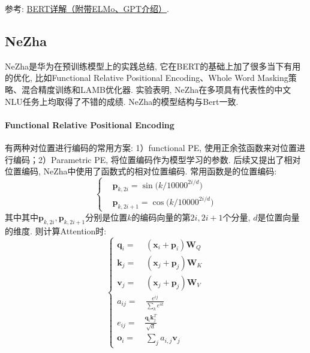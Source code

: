 参考: \href{https://cloud.tencent.com/developer/article/1666168}{BERT详解（附带ELMo、GPT介绍）}.

\subsection{NeZha}
NeZha\cite{junqiu2019nezha}是华为在预训练模型上的实践总结, 它在BERT的基础上加了很多当下有用的优化, 比如Functional Relative Positional Encoding、Whole Word Masking策略、混合精度训练和LAMB优化器. 实验表明, NeZha在多项具有代表性的中文NLU任务上均取得了不错的成绩. NeZha的模型结构与Bert一致. 
\paragraph{Functional Relative Positional Encoding}有两种对位置进行编码的常用方案: 1）functional PE, 使用正余弦函数来对位置进行编码；2）Parametric PE, 将位置编码作为模型学习的参数. 后续又提出了相对位置编码, NeZha中使用了函数式的相对位置编码. 常用函数是的位置编码: 
$$
\begin{equation}\nonumber
	\left\{\begin{aligned}&\boldsymbol{p}_{k,2i}=\sin\Big(k/10000^{2i/d}\Big)\\ 
		&\boldsymbol{p}_{k, 2i+1}=\cos\Big(k/10000^{2i/d}\Big) 
	\end{aligned}\right.
\end{equation}
$$
其中其中$\boldsymbol{p}_{k,2i}, \boldsymbol{p}_{k,2i+1}$分别是位置$k$的编码向量的第$2i, 2i+1$个分量, $d$是位置向量的维度. 则计算Attention时: 
$$
\begin{equation}\nonumber
	\left\{
	\begin{aligned} 
		\boldsymbol{q}_i =&\, (\boldsymbol{x}_i + \boldsymbol{p}_i)\boldsymbol{W}_Q \\ 
		\boldsymbol{k}_j =&\, (\boldsymbol{x}_j + \boldsymbol{p}_j)\boldsymbol{W}_K \\ 
		\boldsymbol{v}_j =&\, (\boldsymbol{x}_j + \boldsymbol{p}_j)\boldsymbol{W}_V \\ 
		a_{ij} =&\, \frac{e^{ij}}{\sum_k e^{ik}}\\ 
		e_{ij} =& \frac{\boldsymbol{q}_i \boldsymbol{k}_j^T}{\sqrt{d}}\\
		\boldsymbol{o}_i =&\, \sum_j a_{i,j}\boldsymbol{v}_j 
	\end{aligned}\right.
\end{equation}
$$

